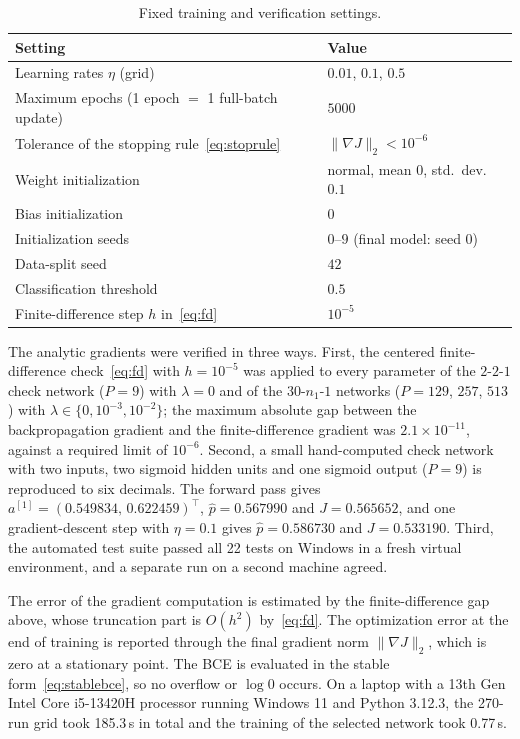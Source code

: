 \begin{table}[htbp]
  \centering
  \caption{Fixed training and verification settings.}
  \label{tab:settings}
  \begin{tabular}{@{}ll@{}}
    \toprule
    Setting & Value \\
    \midrule
    Learning rates $\eta$ (grid) & $0.01$, $0.1$, $0.5$ \\
    Maximum epochs (1 epoch $=$ 1 full-batch update) & $5000$ \\
    Tolerance of the stopping rule~\eqref{eq:stoprule} & $\lVert\nabla J\rVert_2<10^{-6}$ \\
    Weight initialization & normal, mean $0$, std.\ dev.\ $0.1$ \\
    Bias initialization & $0$ \\
    Initialization seeds & $0$--$9$ (final model: seed $0$) \\
    Data-split seed & $42$ \\
    Classification threshold & $0.5$ \\
    Finite-difference step $h$ in~\eqref{eq:fd} & $10^{-5}$ \\
    \bottomrule
  \end{tabular}
\end{table}

The analytic gradients were verified in three ways. First, the centered finite-difference check~\eqref{eq:fd} with $h=10^{-5}$ was applied to every parameter of the $2$-$2$-$1$ check network ($P=9$) with $\lambda=0$ and of the $30$-$n_1$-$1$ networks ($P=129$, $257$, $513$) with $\lambda\in\{0,10^{-3},10^{-2}\}$; the maximum absolute gap between the backpropagation gradient and the finite-difference gradient was $2.1\times10^{-11}$, against a required limit of $10^{-6}$. Second, a small hand-computed check network with two inputs, two sigmoid hidden units and one sigmoid output ($P=9$) is reproduced to six decimals. The forward pass gives $a^{[1]}=(0.549834,\,0.622459)^{\top}$, $\hat p=0.567990$ and $J=0.565652$, and one gradient-descent step with $\eta=0.1$ gives $\hat p=0.586730$ and $J=0.533190$. Third, the automated test suite passed all 22 tests on Windows in a fresh virtual environment, and a separate run on a second machine agreed.

The error of the gradient computation is estimated by the finite-difference gap above, whose truncation part is $O(h^{2})$ by~\eqref{eq:fd}. The optimization error at the end of training is reported through the final gradient norm $\lVert\nabla J\rVert_2$, which is zero at a stationary point. The BCE is evaluated in the stable form~\eqref{eq:stablebce}, so no overflow or $\log 0$ occurs. On a laptop with a 13th Gen Intel Core i5-13420H processor running Windows 11 and Python 3.12.3, the 270-run grid took 185.3\,s in total and the training of the selected network took 0.77\,s.

